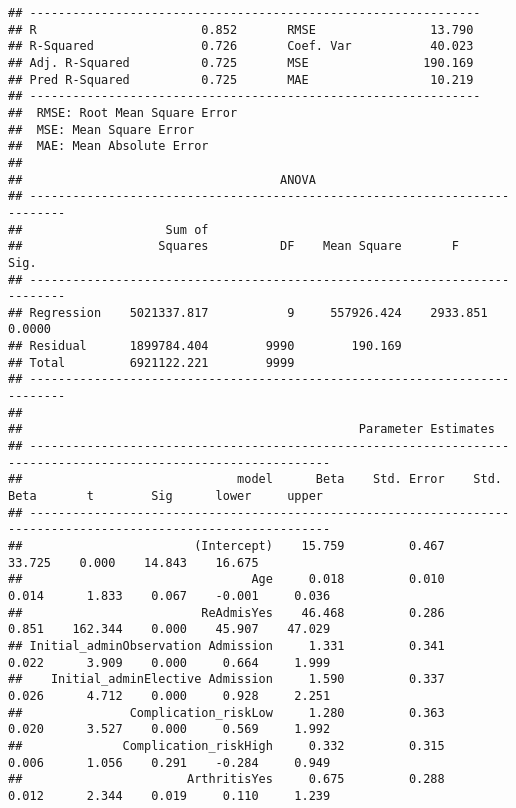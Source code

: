 \documentclass[
]{article}
\begin{document}
\begin{verbatim}
## ---------------------------------------------------------------
## R                       0.852       RMSE                13.790 
## R-Squared               0.726       Coef. Var           40.023 
## Adj. R-Squared          0.725       MSE                190.169 
## Pred R-Squared          0.725       MAE                 10.219 
## ---------------------------------------------------------------
##  RMSE: Root Mean Square Error 
##  MSE: Mean Square Error 
##  MAE: Mean Absolute Error 
## 
##                                    ANOVA                                    
## ---------------------------------------------------------------------------
##                    Sum of                                                  
##                   Squares          DF    Mean Square       F          Sig. 
## ---------------------------------------------------------------------------
## Regression    5021337.817           9     557926.424    2933.851    0.0000 
## Residual      1899784.404        9990        190.169                       
## Total         6921122.221        9999                                      
## ---------------------------------------------------------------------------
## 
##                                               Parameter Estimates                                                
## ----------------------------------------------------------------------------------------------------------------
##                              model      Beta    Std. Error    Std. Beta       t        Sig      lower     upper 
## ----------------------------------------------------------------------------------------------------------------
##                        (Intercept)    15.759         0.467                  33.725    0.000    14.843    16.675 
##                                Age     0.018         0.010        0.014      1.833    0.067    -0.001     0.036 
##                         ReAdmisYes    46.468         0.286        0.851    162.344    0.000    45.907    47.029 
## Initial_adminObservation Admission     1.331         0.341        0.022      3.909    0.000     0.664     1.999 
##    Initial_adminElective Admission     1.590         0.337        0.026      4.712    0.000     0.928     2.251 
##               Complication_riskLow     1.280         0.363        0.020      3.527    0.000     0.569     1.992 
##              Complication_riskHigh     0.332         0.315        0.006      1.056    0.291    -0.284     0.949 
##                       ArthritisYes     0.675         0.288        0.012      2.344    0.019     0.110     1.239 

\end{verbatim}
\end{document}
